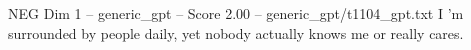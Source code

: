 \begin{textsample}{NEG Dim 1 – generic\_gpt – Score 2.00 – generic\_gpt/t1104\_gpt.txt}  \label{ex:f1_neg_039}
I ’m surrounded by people daily, yet nobody actually knows me or really cares.

\end{textsample}
